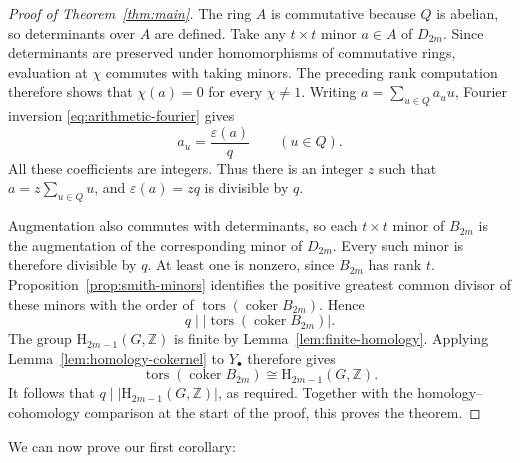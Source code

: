 \documentclass[11pt,a4paper]{amsart}
\numberwithin{equation}{section}
\newcommand{\HH}{\mathrm H}
\newcommand{\Z}{\mathbb Z}
\begin{document}
\begin{proof}[Proof of Theorem~\ref{thm:main}]
The ring $A$ is commutative because $Q$ is abelian, so
determinants over $A$ are defined. Take any $t\times t$ minor
$a\in A$ of $D_{2m}$. Since determinants are preserved under homomorphisms of commutative rings, evaluation at $\chi$ commutes with taking minors. The preceding rank computation therefore shows
that $\chi(a)=0$ for every $\chi\neq1$.
Writing $a=\sum_{u\in Q}a_u u$, Fourier inversion
\eqref{eq:arithmetic-fourier} gives
\[
 a_u=\frac{\varepsilon(a)}q\qquad(u\in Q).
\]
All these coefficients are integers. Thus there is an integer
$z$ such that $a=z\sum_{u\in Q}u$, and
$\varepsilon(a)=zq$ is divisible by $q$.

Augmentation also commutes with determinants, so each
$t\times t$ minor of $B_{2m}$ is the augmentation of the
corresponding minor of $D_{2m}$. Every such minor is therefore
divisible by $q$. At least one is nonzero, since $B_{2m}$ has
rank $t$.
Proposition~\ref{prop:smith-minors} identifies the positive
greatest common divisor of these minors with the order of
$\operatorname{tors}(\operatorname{coker}B_{2m})$. Hence
\[
 q\mid\bigl|\operatorname{tors}
                   (\operatorname{coker}B_{2m})\bigr|.
\]
The group $\HH_{2m-1}(G,\Z)$ is finite by
Lemma~\ref{lem:finite-homology}. Applying
Lemma~\ref{lem:homology-cokernel} to $Y_\bullet$ therefore gives
\[
 \operatorname{tors}(\operatorname{coker}B_{2m})
 \cong\HH_{2m-1}(G,\Z).
\]
It follows that $q\mid|\HH_{2m-1}(G,\Z)|$, as required.
Together with the homology--cohomology comparison at the start
of the proof, this proves the theorem.
\end{proof}


We can now prove our first corollary:
\end{document}
